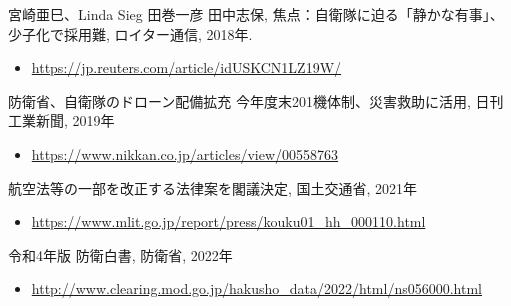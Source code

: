 \documentclass{article}[jsarticle]
\begin{document}
\begin{thebibliography}{99}
     宮崎亜巳、Linda Sieg 田巻一彦 田中志保, 焦点：自衛隊に迫る「静かな有事」、少子化で採用難, ロイター通信, 2018年.
    \begin{itemize}
        \item \url{https://jp.reuters.com/article/idUSKCN1LZ19W/}
    \end{itemize}
     防衛省、自衛隊のドローン配備拡充 今年度末201機体制、災害救助に活用, 日刊工業新聞, 2019年
    \begin{itemize}
        \item \url{https://www.nikkan.co.jp/articles/view/00558763}
    \end{itemize}
     航空法等の一部を改正する法律案を閣議決定, 国土交通省, 2021年
    \begin{itemize}
        \item \url{https://www.mlit.go.jp/report/press/kouku01_hh_000110.html}
    \end{itemize}
     令和4年版 防衛白書, 防衛省, 2022年
    \begin{itemize}
        \item \url{http://www.clearing.mod.go.jp/hakusho_data/2022/html/ns056000.html}
    \end{itemize}
\end{thebibliography}
\end{document}
